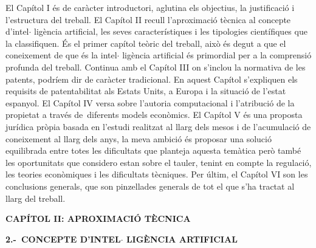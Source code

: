 \documentclass[12pt]{article}
\renewcommand{\_}{\kern-1.5pt\textunderscore\kern-1.5pt}
\begin{document}
\begin{itemize}
\vspace{\baselineskip}
\begin{justify}
El Capítol I és de caràcter introductori, aglutina els objectius, la justificació i l’estructura del treball. El Capítol II recull l’aproximació tècnica al concepte d’intel$ \cdot $ ligència artificial, les seves característiques i les tipologies científiques que la classifiquen. És el primer capítol teòric del treball, això és degut a que el coneixement de que és la intel$ \cdot $ ligència artificial és primordial per a la comprensió profunda del treball. Continua amb el Capítol III on s’inclou la normativa de les patents, podríem dir de caràcter tradicional. En aquest Capítol s’expliquen els requisits de patentabilitat als Estats Units, a Europa i la situació de l’estat espanyol. El Capítol IV versa sobre l’autoria computacional i l’atribució de la propietat a través de\ diferents models econòmics.  El Capítol V és una proposta jurídica pròpia basada en l’estudi realitzat al llarg dels mesos i de l’acumulació de coneixement al llarg dels anys, la meva ambició és proposar una solució equilibrada entre totes les dificultats que planteja aquesta temàtica però també les oportunitats que considero estan sobre el tauler, tenint en compte la regulació, les teories econòmiques i les dificultats tècniques. Per últim, el Capítol VI son les conclusions generals, que son pinzellades generals de tot el que s’ha tractat al llarg del treball. 
\end{justify}\par


\vspace{\baselineskip}
\begin{Center}
{\fontsize{16pt}{19.2pt}\selectfont \textbf{CAPÍTOL II: APROXIMACIÓ TÈCNICA}\par}
\end{Center}\par


\vspace{\baselineskip}
\begin{justify}
\textbf{2.-\  CONCEPTE D’INTEL$ \cdot $ LIGÈNCIA ARTIFICIAL}
\end{justify}\par



\end{itemize}
\end{document}
